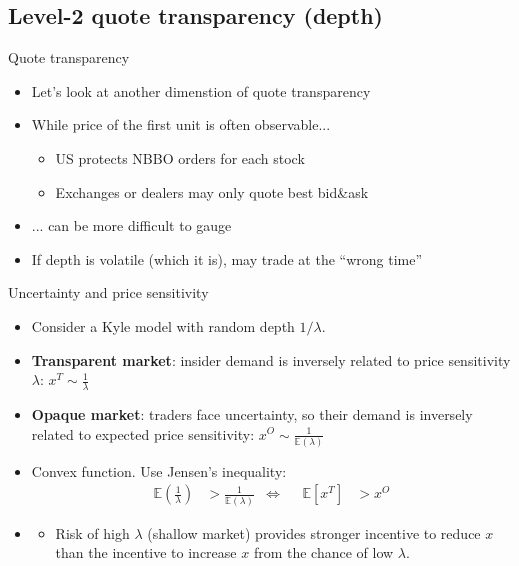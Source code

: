 \documentclass[english,10pt
,aspectratio=169
]{beamer}
\begin{document}
\subsection{Level-2 quote transparency (depth)}

\begin{frame}{Quote transparency}
	\begin{itemize}
		\item Let's look at another dimenstion of quote transparency
		\item While price of the first unit is often observable...
		\begin{itemize}
			\item US protects NBBO orders for each stock
			\item Exchanges or dealers may only quote best bid\&ask
		\end{itemize}
		\item ... can be more difficult to gauge
		\item If depth is volatile (which it is), may trade at the ``wrong time''
	\end{itemize}
\end{frame}


\begin{frame}[label=quotes]{Uncertainty and price sensitivity}
	\begin{itemize}
		\item Consider a Kyle model with random depth $1/\lambda$.
		\item \textbf{Transparent market}: insider demand is inversely related to price sensitivity $\lambda$: $x^T \sim \frac{1}{\lambda}$
		\item \textbf{Opaque market}: traders face uncertainty, so their demand is inversely related to expected price sensitivity: $x^O \sim \frac{1}{\mathbb{E}(\lambda)}$
		\item Convex function. Use Jensen's inequality: 
		\begin{align*}
			\mathbb{E}\left(\frac{1}{\lambda}\right) &> \frac{1}{\mathbb{E}(\lambda)}
			&\iff & &
			\mathbb{E} [x^T] &> x^O
		\end{align*}
		\item {}
		\begin{itemize}
			\item Risk of high $\lambda$ (shallow market) provides stronger incentive to reduce $x$ than the incentive to increase $x$ from the chance of low $\lambda$.
		\end{itemize}
	\end{itemize}
\end{frame}
\end{document}
